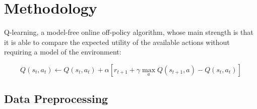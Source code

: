 \documentclass[a4paper]{article}
\begin{document}

\section{Methodology}

Q-learning, a model-free online off-policy algorithm, whose main strength is that it is able to compare the expected utility of the available actions without requiring a model of the environment:

\begin{equation}
        Q(s_t, a_t) \gets Q(s_t, a_t) + \alpha [r_{t+1} + \gamma \max_a Q(s_{t+1}, a) - Q(s_t, a_t)]
\end{equation}

\subsection{Data Preprocessing}
\end{document}
